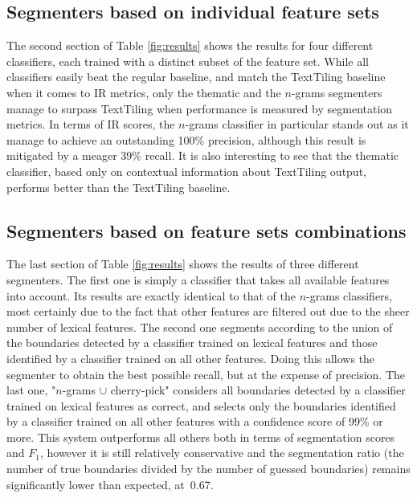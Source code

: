 \subsection{Segmenters based on individual feature sets}

The second section of Table \ref{fig:results} shows the results for four different classifiers, each trained with a distinct subset of the feature set. While all classifiers easily beat the regular baseline, and match the TextTiling baseline when it comes to IR metrics, only the thematic and the $n$-grams segmenters manage to surpass TextTiling when performance is measured by segmentation metrics. In terms of IR scores, the $n$-grams classifier in particular stands out as it manage to achieve an outstanding 100\% precision, although this result is mitigated by a meager 39\% recall. It is also interesting to see that the thematic classifier, based only on contextual information about TextTiling output, performs better than the TextTiling baseline.


\subsection{Segmenters based on feature sets combinations}

The last section of Table \ref{fig:results} shows the results of three different segmenters. The first one is simply a classifier that takes all available features into account. Its results are exactly identical to that of the $n$-grams classifiers, most certainly due to the fact that other features are filtered out due to the sheer number of lexical features. The second one segments according to the union of the boundaries detected by a classifier trained on lexical features and those identified by a classifier trained on all other features. Doing this allows the segmenter to obtain the best possible recall, but at the expense of precision. The last one, "$n$-grams $\cup$ cherry-pick"  considers all boundaries detected by a classifier trained on lexical features as correct, and selects only the boundaries identified by a classifier trained on all other features with a confidence score of 99\% or more. This system outperforms all others both in terms of segmentation scores and $F_1$, however it is still relatively conservative and the segmentation ratio (the number of true boundaries divided by the number of guessed boundaries) remains significantly lower than expected, at~0.67.

